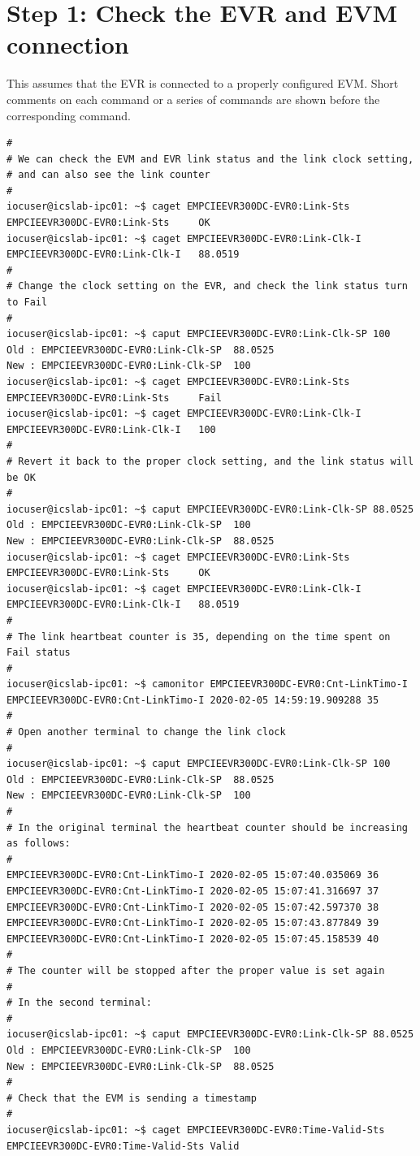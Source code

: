 \documentclass[11pt
  , a4paper
  , article
  , oneside
  , showtrims
]{memoir}
\begin{document}
{\section{Step 1: Check the EVR and EVM connection}
This assumes that the EVR is connected to a properly configured EVM. Short comments on each command or a series of commands are shown before the corresponding command.
\begin{lstlisting}[style=termstyle]
#
# We can check the EVM and EVR link status and the link clock setting,
# and can also see the link counter
#
iocuser@icslab-ipc01: ~$ caget EMPCIEEVR300DC-EVR0:Link-Sts
EMPCIEEVR300DC-EVR0:Link-Sts     OK
iocuser@icslab-ipc01: ~$ caget EMPCIEEVR300DC-EVR0:Link-Clk-I
EMPCIEEVR300DC-EVR0:Link-Clk-I   88.0519
#
# Change the clock setting on the EVR, and check the link status turn to Fail
#
iocuser@icslab-ipc01: ~$ caput EMPCIEEVR300DC-EVR0:Link-Clk-SP 100
Old : EMPCIEEVR300DC-EVR0:Link-Clk-SP  88.0525
New : EMPCIEEVR300DC-EVR0:Link-Clk-SP  100
iocuser@icslab-ipc01: ~$ caget EMPCIEEVR300DC-EVR0:Link-Sts
EMPCIEEVR300DC-EVR0:Link-Sts     Fail
iocuser@icslab-ipc01: ~$ caget EMPCIEEVR300DC-EVR0:Link-Clk-I
EMPCIEEVR300DC-EVR0:Link-Clk-I   100
#
# Revert it back to the proper clock setting, and the link status will be OK
#
iocuser@icslab-ipc01: ~$ caput EMPCIEEVR300DC-EVR0:Link-Clk-SP 88.0525
Old : EMPCIEEVR300DC-EVR0:Link-Clk-SP  100
New : EMPCIEEVR300DC-EVR0:Link-Clk-SP  88.0525
iocuser@icslab-ipc01: ~$ caget EMPCIEEVR300DC-EVR0:Link-Sts
EMPCIEEVR300DC-EVR0:Link-Sts     OK
iocuser@icslab-ipc01: ~$ caget EMPCIEEVR300DC-EVR0:Link-Clk-I
EMPCIEEVR300DC-EVR0:Link-Clk-I   88.0519
#
# The link heartbeat counter is 35, depending on the time spent on Fail status
#
iocuser@icslab-ipc01: ~$ camonitor EMPCIEEVR300DC-EVR0:Cnt-LinkTimo-I
EMPCIEEVR300DC-EVR0:Cnt-LinkTimo-I 2020-02-05 14:59:19.909288 35
#
# Open another terminal to change the link clock
#
iocuser@icslab-ipc01: ~$ caput EMPCIEEVR300DC-EVR0:Link-Clk-SP 100
Old : EMPCIEEVR300DC-EVR0:Link-Clk-SP  88.0525
New : EMPCIEEVR300DC-EVR0:Link-Clk-SP  100
#
# In the original terminal the heartbeat counter should be increasing as follows:
#
EMPCIEEVR300DC-EVR0:Cnt-LinkTimo-I 2020-02-05 15:07:40.035069 36
EMPCIEEVR300DC-EVR0:Cnt-LinkTimo-I 2020-02-05 15:07:41.316697 37
EMPCIEEVR300DC-EVR0:Cnt-LinkTimo-I 2020-02-05 15:07:42.597370 38
EMPCIEEVR300DC-EVR0:Cnt-LinkTimo-I 2020-02-05 15:07:43.877849 39
EMPCIEEVR300DC-EVR0:Cnt-LinkTimo-I 2020-02-05 15:07:45.158539 40
#
# The counter will be stopped after the proper value is set again
#
# In the second terminal:
#
iocuser@icslab-ipc01: ~$ caput EMPCIEEVR300DC-EVR0:Link-Clk-SP 88.0525
Old : EMPCIEEVR300DC-EVR0:Link-Clk-SP  100
New : EMPCIEEVR300DC-EVR0:Link-Clk-SP  88.0525
#
# Check that the EVM is sending a timestamp
#
iocuser@icslab-ipc01: ~$ caget EMPCIEEVR300DC-EVR0:Time-Valid-Sts
EMPCIEEVR300DC-EVR0:Time-Valid-Sts Valid
\end{lstlisting}


}
\end{document}
